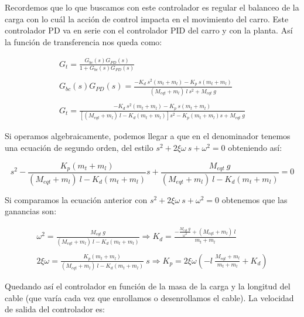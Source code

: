 \documentclass[11pt]{article}
\begin{document}
Recordemos que lo que buscamos con este controlador es regular el balanceo de la carga con lo cuál la acción de control impacta en el movimiento del carro. Este controlador PD va en serie con el controlador PID del carro y con la planta. Así la función de transferencia nos queda como:

\begin{equation}
	\label{eq:funcion_transferencia_controlador}
	\begin{matrix}G_t=\frac{G_{bc}(s)G_{PD}(s)}{1+G_{bc}(s)G_{PD}(s)}\\\\G_{bc}(s)G_{PD}(s)=\frac{-K_d\:s^{2}(m_t+m_l)-K_p\:s(m_t+m_l)}{(M_{eqt}+m_l)\:l\:s^{2}+M_{eqt}\:g}\\ \\G_t=\frac{-K_d\:s^{2}(m_t+m_l)-K_p\:s(m_t+m_l)}{\left [ (M_{eqt}+m_l)\:l-K_d(m_t+m_l) \right ]s^{2}-K_p(m_t+m_l)s+M_{eqt}\:g}\end{matrix}
\end{equation}

Si operamos algebraicamente, podemos llegar a que en el denominador tenemos una ecuación de segundo orden, del estilo $s^2+2\xi\omega\ s+\omega^2=0$ obteniendo así:

\begin{equation}
	\label{eq:funcion_transferencia_controlador_2}
	s^2-\frac{K_p(m_t+m_l)}{(M_{eqt}+m_l)\ l-K_d(m_t+m_l)}s+\frac{M_{eqt}\ g}{(M_{eqt}+m_l)\ l-K_d(m_t+m_l)}=0
\end{equation}

Si comparamos la ecuación anterior con $s^2+2\xi\omega\ s+\omega^2=0$ obtenemos que las ganancias son:

\begin{equation}
	\label{eq:ganancias}
	\begin{matrix}\omega ^{2}=\frac{M_{eqt}\:g}{(M_{eqt}+m_l)\:l-K_d(m_t+m_l)}\Rightarrow K_d=\frac{-\frac{M_{eqt}\:g}{\omega^{2}}+(M_{eqt}+m_l)\:l}{m_t+m_l}\\ \\2\xi \omega =\frac{K_p(m_t+m_l)}{(M_{eqt}+m_l)\:l-K_d(m_t+m_l)}\:s\Rightarrow K_p=2\xi \omega\left ( -l\:\frac{M_{eqt}+m_l}{m_t+m_l}+K_d \right )\end{matrix}
\end{equation}

Quedando así el controlador en función de la masa de la carga y la longitud del cable (que varía cada vez que enrollamos o desenrollamos el cable). La velocidad de salida del controlador es:
\end{document}
